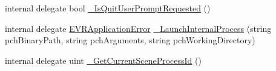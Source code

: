 \begin{DoxyCompactItemize}
\item 
internal delegate bool \mbox{\hyperlink{struct_valve_1_1_v_r_1_1_i_v_r_applications_a76f4a8aeee6300e437459098141890b3}{\+\_\+\+Is\+Quit\+User\+Prompt\+Requested}} ()
\item 
internal delegate \mbox{\hyperlink{namespace_valve_1_1_v_r_a3488adab8a219b579fcee50f4e63a8b6}{E\+V\+R\+Application\+Error}} \mbox{\hyperlink{struct_valve_1_1_v_r_1_1_i_v_r_applications_a298a348612023308adffef70f09fba4d}{\+\_\+\+Launch\+Internal\+Process}} (string pch\+Binary\+Path, string pch\+Arguments, string pch\+Working\+Directory)
\item 
internal delegate uint \mbox{\hyperlink{struct_valve_1_1_v_r_1_1_i_v_r_applications_a2d37b2fc76a95f568513ca91e7baf553}{\+\_\+\+Get\+Current\+Scene\+Process\+Id}} ()
\end{DoxyCompactItemize}
